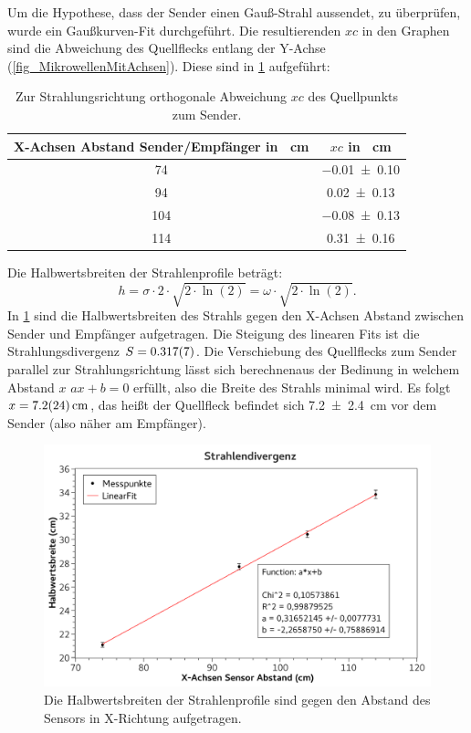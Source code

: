 \documentclass[
	a4paper,
	12pt,
	pagesize,
	ngerman
]{scrartcl}
\begin{document}
	Um die Hypothese, dass der Sender einen Gauß-Strahl aussendet, zu überprüfen, wurde ein Gaußkurven-Fit durchgeführt. 
	Die resultierenden $xc$ in den Graphen sind die Abweichung des Quellflecks entlang der Y-Achse (\cref{fig_MikrowellenMitAchsen}). 
	Diese sind in \cref{tab_xc} aufgeführt:
	\begin{table}[H]
		\centering
		\begin{tabular}{ c | c }
			X-Achsen Abstand Sender/Empfänger in \SI{}{cm} & $xc$ in \SI{}{cm}  \\ \hline
			\SI{74}{}&\SI{-0,01+-0,10}{}\\
			\SI{94}{}&\SI{0,02+-0,13}{}\\
			\SI{104}{}&\SI{-0,08+-0,13}{}\\
			\SI{114}{}&\SI{0,31+-0,16}{}\\
		\end{tabular}
		\caption{Zur Strahlungsrichtung orthogonale Abweichung $xc$ des Quellpunkts zum Sender.}
		\label{tab_xc} 
	\end{table}

	Die Halbwertsbreiten der Strahlenprofile beträgt: 
	\begin{equation}
		h = \sigma \cdot 2 \cdot \sqrt{2\cdot\ln(2)} = \omega \cdot \sqrt{2\cdot\ln(2)}.
	\end{equation}
	In \cref{fig_divergenz} sind die Halbwertsbreiten des Strahls gegen den X-Achsen Abstand zwischen Sender und Empfänger aufgetragen.
	Die Steigung des linearen Fits ist die Strahlungsdivergenz $S = \SI{0,317+-0,007}{}$.
	Die Verschiebung des Quellflecks zum Sender parallel zur Strahlungsrichtung lässt sich berechnenaus der Bedinung in welchem Abstand $x$ $ax+b=0$ erfüllt, also die Breite des Strahls minimal wird.
	Es folgt $x=\SI{7,2+-2,4}{cm}$, das heißt der Quellfleck befindet sich \SI{7,2+-2,4}{cm} vor dem Sender (also näher am Empfänger).

	\begin{figure}[H]
		\includegraphics[width=1\textwidth]{fig_divergenz}
		\centering
		\caption{Die Halbwertsbreiten der Strahlenprofile sind gegen den Abstand des Sensors in X-Richtung aufgetragen.}
		\label{fig_divergenz}
		\centering
	\end{figure}
	
\end{document}
